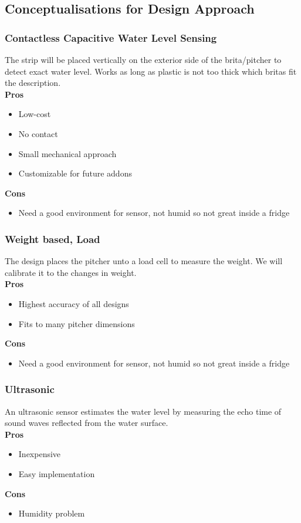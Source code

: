\subsection{Conceptualisations for Design Approach}
\subsubsection{Contactless Capacitive Water Level Sensing}
The strip will be placed vertically on the exterior side of the brita/pitcher to detect exact water level. 
Works as long as plastic is not too thick which britas fit the description. \\

\noindent\textbf{Pros}
    \begin{itemize}
    \item Low-cost
    \item No contact
    \item Small mechanical approach
    \item Customizable for future addons
    \end{itemize}
\noindent\textbf{Cons}
    \begin{itemize}
    \item Need a good environment for sensor, not humid so not great inside a fridge
    \end{itemize}

\subsubsection{Weight based, Load}
The design places the pitcher unto a load cell to measure the weight. We will calibrate it to the changes in weight.\\
\noindent\textbf{Pros}
    \begin{itemize}
    \item Highest accuracy of all designs
    \item Fits to many pitcher dimensions
    \end{itemize}
\noindent\textbf{Cons}
    \begin{itemize}
    \item Need a good environment for sensor, not humid so not great inside a fridge
    \end{itemize}

\subsubsection{Ultrasonic}
An ultrasonic sensor estimates the water level by measuring the echo time of sound waves reflected from the water surface.\\
\noindent\textbf{Pros}
    \begin{itemize}
    \item Inexpensive
    \item Easy implementation
    \end{itemize}
\noindent\textbf{Cons}
    \begin{itemize}
    \item Humidity problem
    \end{itemize}


